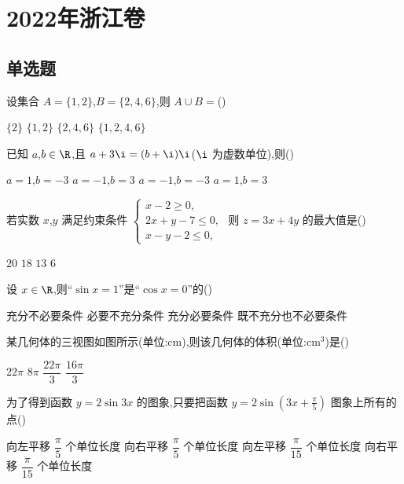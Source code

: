\chapter{2022年浙江卷}

\section{单选题}

\begin{problem}
设集合 \(A=\{1,2\}\),\(B=\{2,4,6\}\),则 \(A\cup B=\)(\quad)

\choices
    {\(\{2\}\)}
    {\(\{1,2\}\)}
    {\(\{2,4,6\}\)}
    {\(\{1,2,4,6\}\)}
\end{problem}

\begin{problem}
已知 \(a\),\(b\in\R\),且 \(a+3\i=(b+\i)\i\)(\(\i\) 为虚数单位),则(\quad)

\choices
    {\(a=1\),\(b=-3\)}
    {\(a=-1\),\(b=3\)}
    {\(a=-1\),\(b=-3\)}
    {\(a=1\),\(b=3\)}
\end{problem}

\begin{problem}
若实数 \(x\),\(y\) 满足约束条件
\(\begin{cases}
x-2\ge 0,\\
2x+y-7\le 0,\\
x-y-2\le 0,
\end{cases}\)
则 \(z=3x+4y\) 的最大值是(\quad)

\choices
    {\(20\)}
    {\(18\)}
    {\(13\)}
    {\(6\)}
\end{problem}

\begin{problem}
设 \(x\in\R\),则``\(\sin x=1\)''是``\(\cos x=0\)''的(\quad)

\choices
    {充分不必要条件}
    {必要不充分条件}
    {充分必要条件}
    {既不充分也不必要条件}
\end{problem}

\begin{problem}
某几何体的三视图如图所示(单位:\(\mathrm{cm}\)),则该几何体的体积(单位:\(\mathrm{cm}^3\))是(\quad)


\choices
    {\(22\pi\)}
    {\(8\pi\)}
    {\(\dfrac{22\pi}{3}\)}
    {\(\dfrac{16\pi}{3}\)}
\end{problem}

\begin{problem}
为了得到函数 \(y=2\sin 3x\) 的图象,只要把函数 \(y=2\sin\left(3x+\frac{\pi}{5}\right)\) 图象上所有的点(\quad)

\choices
    {向左平移 \(\dfrac{\pi}{5}\) 个单位长度}
    {向右平移 \(\dfrac{\pi}{5}\) 个单位长度}
    {向左平移 \(\dfrac{\pi}{15}\) 个单位长度}
    {向右平移 \(\dfrac{\pi}{15}\) 个单位长度}
\end{problem}

